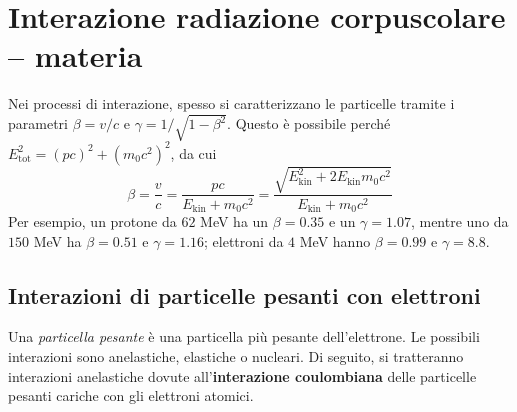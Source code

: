 \documentclass[11pt, a4paper]{scrartcl}
\theoremstyle{style}
\theoremstyle{style1}
\numberwithin{equation}{subsection}
\begin{document}
\newpage
\section{Interazione radiazione corpuscolare -- materia}

Nei processi di interazione, spesso si caratterizzano le particelle tramite i parametri $\beta = v / c$ e $\gamma = 1 / \sqrt{1-\beta ^2} $.
Questo \`e possibile perch\'e $E_\text{tot}^2 = (pc)^2 + (m_0c^2)^2$, da cui 
\[
	\beta  = \frac{v}{c} = \frac{pc}{E_\text{kin} + m_0c^2} = \frac{\sqrt{E_\text{kin}^2 + 2 E_\text{kin} m_0c^2} }{E_\text{kin} + m_0c^2}
\] 
Per esempio, un protone da $62$ MeV ha un $\beta  = 0.35$ e un $\gamma = 1.07$, mentre uno da $150$ MeV ha $\beta =0.51$ e $\gamma = 1.16$; elettroni da $4$ MeV hanno $\beta =0.99$ e $\gamma = 8.8$.

\subsection{Interazioni di particelle pesanti con elettroni}

Una \textit{particella pesante} \`e una particella pi\`u pesante dell'elettrone.
Le possibili interazioni sono anelastiche, elastiche o nucleari. 
Di seguito, si tratteranno interazioni anelastiche dovute all'\textbf{interazione coulombiana} delle particelle pesanti cariche con gli elettroni atomici.
\end{document}
